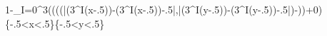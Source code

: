 ﻿1-\prod_{I=0}^{3}\left(\left(\left(\max\left(\left|\left(3^{I}\left(x-.5\right)\right)-\left(3^{I}\left(x-.5\right)\right)-.5\right|,\left|\left(3^{I}\left(y-.5\right)\right)-\left(3^{I}\left(y-.5\right)\right)-.5\right|\right)-\right)\right)+0\right)\left\{-.5<x<.5\right\}\left\{-.5<y<.5\right\}